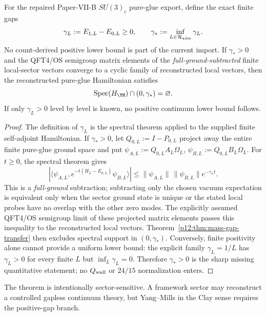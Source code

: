 \documentclass[12pt,a4paper]{article}
\begin{document}
\begin{corollary}
\label{p12:cor:paper11-pure-glue-gap-floor}
For the repaired Paper-VII-B \(SU(3)_c\) pure-glue export, define the exact finite gaps
\begin{equation}
\label{p12:eq:paper11-finite-gap-sequence}
\gamma_L:=E_{1,L}-E_{0,L}\ge0,
\qquad
\gamma_*:=\inf_{L\in\mathcal R_{\rm adm}}\gamma_L .
\end{equation}
No count-derived positive lower bound is part of the current import.  If \(\gamma_*>0\) and the QFT4/OS semigroup matrix elements of the
\emph{full-ground-subtracted} finite local-sector vectors converge to a
cyclic family of reconstructed local vectors, then the reconstructed
pure-glue Hamiltonian satisfies
\begin{equation}
\label{p12:eq:paper11-continuum-gap-criterion}
\operatorname{Spec}(H_{\YM})\cap(0,\gamma_*)=\varnothing .
\end{equation}
If only \(\gamma_L>0\) level by level is known, no positive continuum lower bound follows.
\end{corollary}
\begin{proof}
The definition of \(\gamma_L\) is the spectral theorem applied to the supplied finite self-adjoint Hamiltonian.  If \(\gamma_*>0\), let \(Q_{0,L}:=I-P_{0,L}\) project away the entire
finite pure-glue ground space and put
\(\psi_{A,L}:=Q_{0,L}A_L\Omega_L\),
\(\psi_{B,L}:=Q_{0,L}B_L\Omega_L\). For \(t\ge0\), the spectral theorem gives
\[
|\langle \psi_{A,L},e^{-t(H_L-E_{0,L})}\psi_{B,L}\rangle|
\le \|\psi_{A,L}\|\,\|\psi_{B,L}\|e^{-\gamma_*t}.
\]
This is a \emph{full-ground} subtraction; subtracting only the chosen
vacuum expectation is equivalent only when the sector ground state is unique
or the stated local probes have no overlap with the other zero modes.
The explicitly assumed QFT4/OS semigroup limit of these projected
matrix elements passes this inequality to the reconstructed local vectors.  Theorem~\ref{p12:thm:mass-gap-transfer} then excludes spectral support in \((0,\gamma_*)\).  Conversely, finite positivity alone cannot provide a uniform lower bound: the explicit family \(\gamma_L=1/L\) has \(\gamma_L>0\) for every finite \(L\) but \(\inf_L\gamma_L=0\).  Therefore \(\gamma_*>0\) is the sharp missing quantitative statement; no \(Q_{\rm wall}\) or \(24/15\) normalization enters.
\end{proof}

\begin{remark}
\label{p12:rem:gapless-sectors}
The theorem is intentionally sector-sensitive.  A framework sector may reconstruct a controlled gapless continuum theory, but Yang--Mills in the Clay sense requires the positive-gap branch.
\end{remark}
\end{document}
